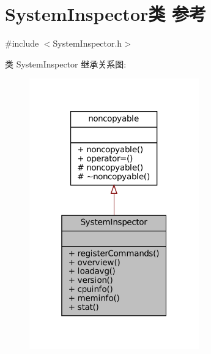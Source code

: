 \hypertarget{classmuduo_1_1net_1_1SystemInspector}{}\section{System\+Inspector类 参考}
\label{classmuduo_1_1net_1_1SystemInspector}


{\ttfamily \#include $<$System\+Inspector.\+h$>$}



类 System\+Inspector 继承关系图\+:
\nopagebreak
\begin{figure}[H]
\begin{center}
\leavevmode
\includegraphics[width=208pt]{classmuduo_1_1net_1_1SystemInspector__inherit__graph}
\end{center}
\end{figure}



